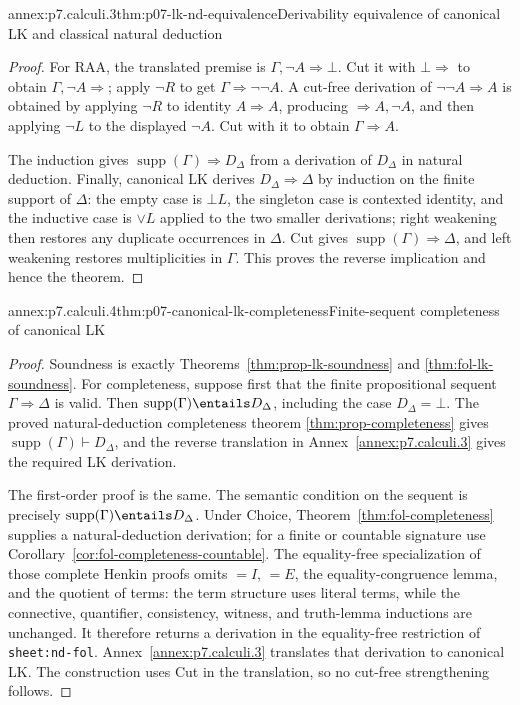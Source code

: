 \begin{annexitem}{annex:p7.calculi.3}{thm:p07-lk-nd-equivalence}{Derivability equivalence of canonical LK and classical natural deduction}
\begin{proof}
For RAA, the translated premise is
\(\Gamma,\neg A\Rightarrow\bot\).  Cut it with \(\bot\Rightarrow\) to obtain
\(\Gamma,\neg A\Rightarrow\); apply \(\neg R\) to get
\(\Gamma\Rightarrow\neg\neg A\).  A cut-free derivation of
\(\neg\neg A\Rightarrow A\) is obtained by applying \(\neg R\) to identity
\(A\Rightarrow A\), producing \(\Rightarrow A,\neg A\), and then applying
\(\neg L\) to the displayed \(\neg A\).  Cut with it to obtain
\(\Gamma\Rightarrow A\).

The induction gives
\(\operatorname{supp}(\Gamma)\Rightarrow D_{\Delta}\) from a derivation of
\(D_{\Delta}\) in natural deduction.  Finally, canonical LK derives
\(D_{\Delta}\Rightarrow\Delta\) by induction on the finite support of
\(\Delta\): the empty case is \(\bot L\), the singleton case is contexted
identity, and the inductive case is \(\lor L\) applied to the two smaller
derivations; right weakening then restores any duplicate occurrences in
\(\Delta\).  Cut gives
\(\operatorname{supp}(\Gamma)\Rightarrow\Delta\), and left weakening restores
multiplicities in \(\Gamma\).  This proves the reverse implication and hence
the theorem.
\end{proof}
\end{annexitem}

\begin{annexitem}{annex:p7.calculi.4}{thm:p07-canonical-lk-completeness}{Finite-sequent completeness of canonical LK}
\begin{proof}
Soundness is exactly Theorems~\ref{thm:prop-lk-soundness} and
\ref{thm:fol-lk-soundness}.  For completeness, suppose first that the finite
propositional sequent \(\Gamma\Rightarrow\Delta\) is valid.  Then
\(\operatorname{supp}(\Gamma)\entails D_{\Delta}\), including the case
\(D_{\Delta}=\bot\).  The proved natural-deduction completeness theorem
\ref{thm:prop-completeness} gives
\(\operatorname{supp}(\Gamma)\vdash D_{\Delta}\), and the reverse translation
in Annex~\ref{annex:p7.calculi.3} gives the required LK derivation.

The first-order proof is the same.  The semantic condition on the sequent is
precisely
\(\operatorname{supp}(\Gamma)\entails D_{\Delta}\).  Under Choice,
Theorem~\ref{thm:fol-completeness} supplies a natural-deduction derivation; for
a finite or countable signature use
Corollary~\ref{cor:fol-completeness-countable}.  The equality-free
specialization of those complete Henkin proofs omits \(=I\), \(=E\), the
equality-congruence lemma, and the quotient of terms: the term structure uses
literal terms, while the connective, quantifier, consistency, witness, and
truth-lemma inductions are unchanged.  It therefore returns a derivation in
the equality-free restriction of \texttt{sheet:nd-fol}.  Annex~\ref{annex:p7.calculi.3}
translates that derivation to canonical LK.  The construction uses Cut in the
translation, so no cut-free strengthening follows.
\end{proof}
\end{annexitem}
